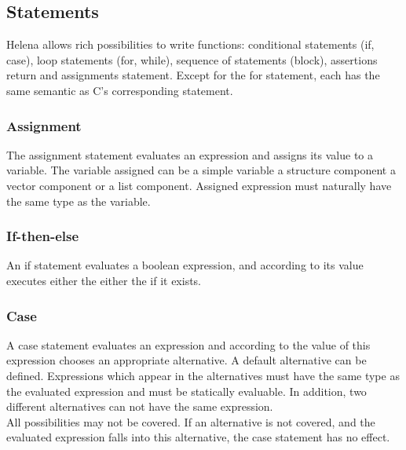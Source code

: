 \functiondef



\subsection{Statements}
Helena allows rich possibilities to write functions: conditional
statements (if, case), loop statements (for, while), sequence of
statements (block), assertions return and assignments statement.
Except for the for statement, each has the same semantic as C's
corresponding statement.\\

\statementdef


\subsubsection{Assignment}
The assignment statement evaluates an expression and assigns its value
to a variable.  The variable assigned can be a simple variable a
structure component a vector component or a list component.  Assigned
expression must naturally have the same type as the variable.\\

\assignmentdef


\subsubsection{If-then-else}
An if statement evaluates a boolean expression, and according to its
value executes either the  either the
 if it exists.\\

\ifdef


\subsubsection{Case}
A case statement evaluates an expression and according to the value of
this expression chooses an appropriate alternative.  A default
alternative can be defined.  Expressions which appear in the
alternatives must have the same type as the evaluated expression and
must be statically evaluable.  In addition, two different alternatives
can not have the same expression.\\
All possibilities may not be covered.  If an alternative is not
covered, and the evaluated expression falls into this alternative, the
case statement has no effect.\\

